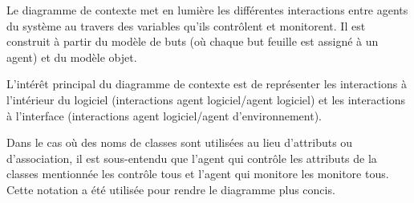 Le diagramme de contexte met en lumière les différentes interactions entre 
agents du système au travers des variables qu'ils contrôlent et monitorent. 
Il est construit à partir du modèle de buts (où chaque but feuille est 
assigné à un agent) et du modèle objet.


L'intérêt principal du diagramme de contexte est de représenter les interactions
à l'intérieur du logiciel (interactions agent logiciel/agent logiciel) et
les interactions à l'interface (interactions agent logiciel/agent
d'environnement).

Dans le cas où des noms de classes sont utilisées au lieu d'attributs ou d'association, il est sous-entendu que l'agent qui contrôle les attributs de la classes mentionnée les contrôle tous et l'agent qui monitore les monitore tous.  Cette notation a été utilisée pour rendre le diagramme plus concis.

